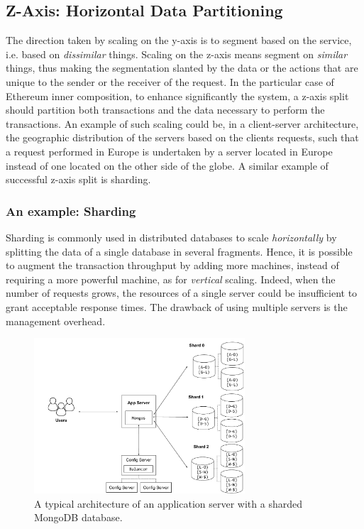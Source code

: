 \subsection{Z-Axis: Horizontal Data Partitioning}
\label{sec:z-axis}

The direction taken by scaling on the y-axis is to segment based on the service,
i.e. based on \emph{dissimilar} things. Scaling on the z-axis means segment on
\emph{similar} things, thus making the segmentation slanted by the data or the
actions that are unique to the sender or the receiver of the request. In the
particular case of Ethereum inner composition, to enhance significantly the
system, a z-axis split should partition both transactions and the data necessary
to perform the transactions. An example of such scaling could be, in a
client-server architecture, the geographic distribution of the servers based on
the clients requests, such that a request performed in Europe is undertaken by a
server located in Europe instead of one located on the other side of the globe.
A similar example of successful z-axis split is sharding.

\subsubsection{An example: Sharding}
Sharding is commonly used in distributed databases to scale \emph{horizontally}
by splitting the data of a single database in several fragments. Hence, it is
possible to augment the transaction throughput by adding more machines, instead
of requiring a more powerful machine, as for \emph{vertical} scaling.
Indeed, when the number of requests grows, the resources of a single server
could be insufficient to grant acceptable response times. The drawback of using
multiple servers is the management overhead.

\begin{figure}
  \begin{center}
    \includegraphics[width=0.7\textwidth]{./res/img/mongodb}
    \caption{A typical architecture of an application server with a sharded
    MongoDB database.}
    \label{fig:mongodb}
  \end{center}
\end{figure}

